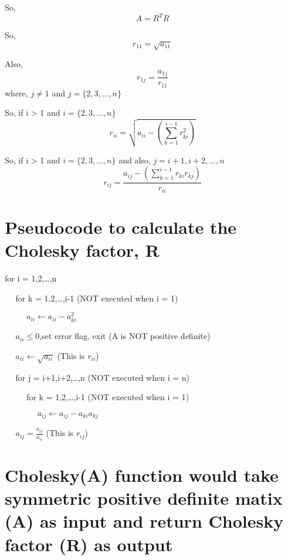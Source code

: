 \documentclass[11pt]{article}
\begin{document}
    So, \[A = R^TR\]

    So, \[r_{11} = \sqrt{a_{11}}\]

    Also, \[r_{1j} = \frac{a_{1j}}{r_{11}}\] where, \(j \neq 1\) and
\(j = \{2,3,...,n\}\)

    So, if i \textgreater{} 1 and \(i = \{2,3,...,n\}\)
\[r_{ii} = \sqrt{a_{ii} - \left(\sum_{k = 1}^{i-1}r_{ki}^2\right)}\]

    So, if i \textgreater{} 1 and \(i = \{2,3,...,n\}\) and also,
\(j = i+1,i+2,...,n\)
\[r_{ij} = \frac{a_{ij} - \left(\sum_{k = 1}^{i-1}r_{ki}r_{kj}\right)}{r_{ii}}\]

    \hypertarget{pseudocode-to-calculate-the-cholesky-factor-r}{%
\section{Pseudocode to calculate the Cholesky factor,
R}\label{pseudocode-to-calculate-the-cholesky-factor-r}}

    for i = 1,2,\ldots{},n

    \(\:\:\:\:\:\:\)for k = 1,2,\ldots{},i-1 (NOT executed when i = 1)

    \(\:\:\:\:\:\:\)\(\:\:\:\:\:\:\)\(a_{ii} \leftarrow a_{ii} - a_{ki}^2\)

    \(\:\:\:\:\:\:\)\(a_{ii} \leq 0\),set error flag, exit (A is NOT
positive definite)

    \(\:\:\:\:\:\:\)\(a_{ii} \leftarrow \sqrt{a_{ii}}\) (This is \(r_{ii}\))

    \(\:\:\:\:\:\:\)for j = i+1,i+2,\ldots{},n (NOT executed when i = n)

    \(\:\:\:\:\:\:\)\(\:\:\:\:\:\:\)for k = 1,2,\ldots{},i-1 (NOT executed
when i = 1)

    \(\:\:\:\:\:\:\)\(\:\:\:\:\:\:\)\(\:\:\:\:\:\:\)\(a_{ij} \leftarrow a_{ij} - a_{ki}a_{kj}\)

    \(\:\:\:\:\:\:\)\(a_{ij} = \frac{a_{ij}}{a_{ii}}\) (This is \(r_{ij}\))

    \hypertarget{choleskya-function-would-take-symmetric-positive-definite-matix-a-as-input-and-return-cholesky-factor-r-as-output}{%
\section{Cholesky(A) function would take symmetric positive definite
matix (A) as input and return Cholesky factor (R) as
output}\label{choleskya-function-would-take-symmetric-positive-definite-matix-a-as-input-and-return-cholesky-factor-r-as-output}}
\end{document}
